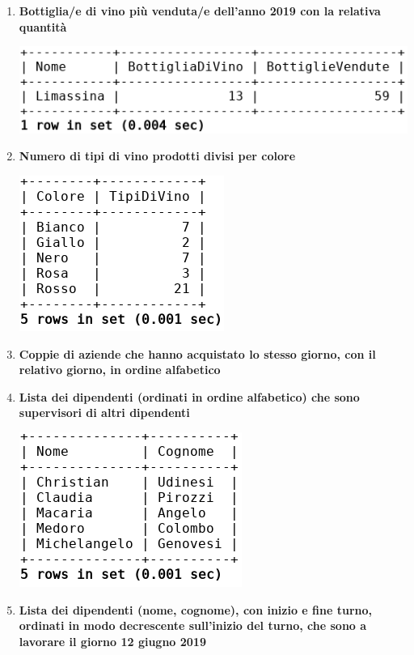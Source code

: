 \begin{enumerate}
	\item \textbf{Bottiglia/e di vino più venduta/e dell'anno 2019 con la relativa quantità}\\
	\centerline{\includegraphics{src/queryIndici/assets/Query1.png}}
	\item \textbf{Numero di tipi di vino prodotti divisi per colore}\\
	\centerline{\includegraphics{src/queryIndici/assets/Query2.png}} 
	\item \textbf{Coppie di aziende che hanno acquistato lo stesso giorno, con il relativo giorno, in ordine alfabetico}
	\item \textbf{Lista dei dipendenti (ordinati in ordine alfabetico) che sono supervisori di altri dipendenti}
	\centerline{\includegraphics{src/queryIndici/assets/Query4.png}}
	\item \textbf{Lista dei dipendenti (nome, cognome), con inizio e fine turno, ordinati in modo decrescente sull'inizio del turno, che sono a lavorare il giorno 12 giugno 2019}

\end{enumerate}
